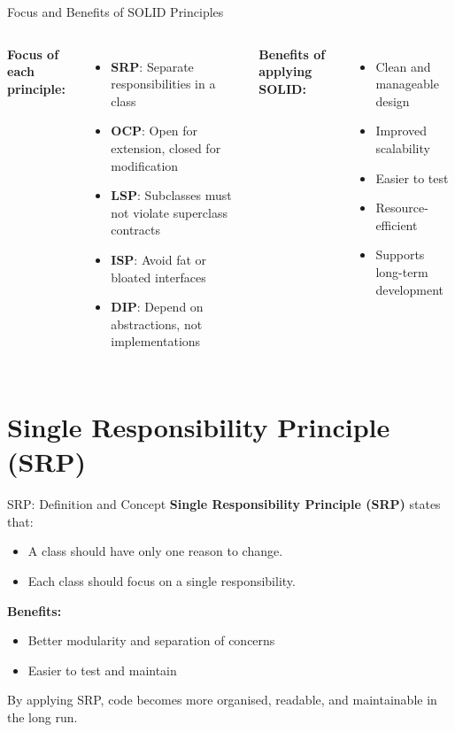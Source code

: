 \documentclass[aspectratio=169, table]{beamer}
\begin{document}
\begin{frame}[fragile]{Focus and Benefits of SOLID Principles}
	\vspace{20pt}
	\begin{columns}[t]
		\textbf{Focus of each principle:}
		\begin{itemize}
			\item \textbf{SRP}: Separate responsibilities in a class
			\item \textbf{OCP}: Open for extension, closed for modification
			\item \textbf{LSP}: Subclasses must not violate superclass contracts
			\item \textbf{ISP}: Avoid fat or bloated interfaces
			\item \textbf{DIP}: Depend on abstractions, not implementations
		\end{itemize}
		
		\textbf{Benefits of applying SOLID:}
		\begin{itemize}
			\item Clean and manageable design
			\item Improved scalability
			\item Easier to test
			\item Resource-efficient
			\item Supports long-term development
		\end{itemize}
	\end{columns}
\end{frame}



\section{Single Responsibility Principle (SRP)}

\begin{frame}[fragile]{SRP: Definition and Concept}
	\vspace{20pt}
	\textbf{Single Responsibility Principle (SRP)} states that:
	\begin{itemize}
		\item A class should have only one reason to change.
		\item Each class should focus on a single responsibility.
	\end{itemize}
	
	\textbf{Benefits:}
	\begin{itemize}
		\item Better modularity and separation of concerns
		\item Easier to test and maintain
	\end{itemize}
	
	By applying SRP, code becomes more organised, readable, and maintainable in the long run.
\end{frame}
\end{document}
